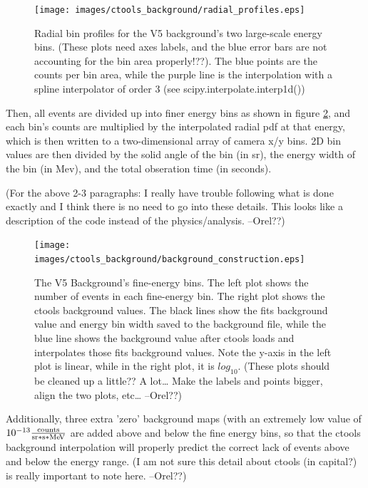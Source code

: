     \begin{figure}[ht]
      \begin{center}
        \texttt{[image: images/ctools\_background/radial\_profiles.eps]}
        \caption[CTOOLS Radial Background Profiles]{Radial bin profiles for the V5 background's two large-scale energy bins.  (These plots need axes labels, and the blue error bars are not accounting for the bin area properly!??).  The blue points are the counts per bin area, while the purple line is the interpolation with a spline interpolator of order 3 (see scipy.interpolate.interp1d())}\label{fig:background_radial}
      \end{center}
    \end{figure}


    Then, all events are divided up into  finer energy bins as shown in figure \ref{fig:background_profile}, and each bin's counts are multiplied by the interpolated radial pdf at that energy, which is then written to a two-dimensional array of camera x/y bins.
    2D bin values are then divided by the solid angle of the bin (in sr), the energy width of the bin (in Mev), and the total obseration time (in seconds).

    (For the above 2-3 paragraphs: I really have trouble following what is done exactly and I think there is no need to go into these details. This looks like a description of the code instead of the physics/analysis. --Orel??)

    \begin{figure}[ht]
      \begin{center}
        \texttt{[image: images/ctools\_background/background\_construction.eps]}
        \caption[CTOOLS Background Fine Energy Bins]{The V5 Background's fine-energy bins.  The left plot shows the number of events in each fine-energy bin.  The right plot shows the ctools background values.  The black lines show the fits background value and energy bin width saved to the background file, while the blue line shows the background value after ctools loads and interpolates those fits background values.  Note the y-axis in the left plot is linear, while in the right plot, it is $log_{10}$. (These plots should be cleaned up a little??  A lot… Make the labels and points bigger, align the two plots, etc… --Orel??)}\label{fig:background_profile}
      \end{center}
    \end{figure}

    Additionally, three extra 'zero' background maps (with an extremely low value of $10^{-13} \frac{\text{counts}}{\text{sr}*\text{s}*\MeV}$ are added above and below the fine energy bins, so that the ctools background interpolation will properly predict the correct lack of events above and below the energy range.
    (I am not sure this detail about ctools (in capital?) is really important to note here. --Orel??)

